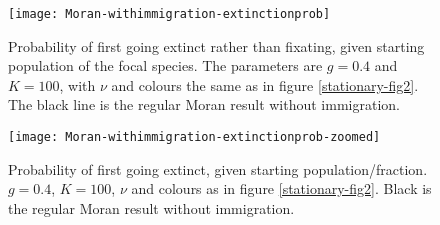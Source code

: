 \begin{figure}[ht]
	\centering
	\texttt{[image: Moran-withimmigration-extinctionprob]}
	\caption{Probability of first going extinct rather than fixating, given starting population of the focal species. The parameters are $g=0.4$ and $K=100$, with $\nu$ and colours the same as in figure \ref{stationary-fig2}. The black line is the regular Moran result without immigration. } \label{extnprobfig}
\end{figure}
\begin{figure}[ht]
	\centering
	\texttt{[image: Moran-withimmigration-extinctionprob-zoomed]}
	\caption{Probability of first going extinct, given starting population/fraction. $g=0.4$, $K=100$, $\nu$ and colours as in figure \ref{stationary-fig2}. Black is the regular Moran result without immigration. }
\end{figure}
\fi

